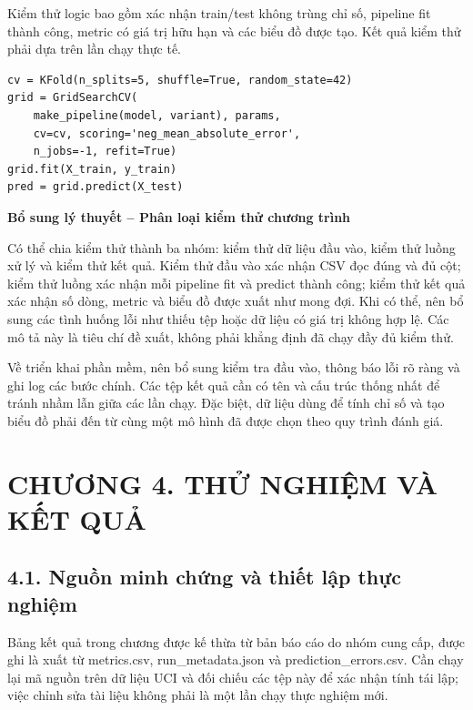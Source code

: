 \documentclass[12pt,a4paper,oneside]{article}
\begin{document}
Kiểm thử logic bao gồm xác nhận train/test không trùng chỉ số, pipeline
fit thành công, metric có giá trị hữu hạn và các biểu đồ được tạo. Kết
quả kiểm thử phải dựa trên lần chạy thực tế.

\begin{verbatim}
cv = KFold(n_splits=5, shuffle=True, random_state=42)
grid = GridSearchCV(
    make_pipeline(model, variant), params,
    cv=cv, scoring='neg_mean_absolute_error',
    n_jobs=-1, refit=True)
grid.fit(X_train, y_train)
pred = grid.predict(X_test)
\end{verbatim}


\par\noindent\textbf{Bổ sung lý thuyết -- Phân loại kiểm thử chương trình}\par
Có thể chia kiểm thử thành ba nhóm: kiểm thử dữ liệu đầu vào, kiểm thử luồng xử lý và kiểm thử kết quả. Kiểm thử đầu vào xác nhận CSV đọc đúng và đủ cột; kiểm thử luồng xác nhận mỗi pipeline fit và predict thành công; kiểm thử kết quả xác nhận số dòng, metric và biểu đồ được xuất như mong đợi. Khi có thể, nên bổ sung các tình huống lỗi như thiếu tệp hoặc dữ liệu có giá trị không hợp lệ. Các mô tả này là tiêu chí đề xuất, không phải khẳng định đã chạy đầy đủ kiểm thử.\par

Về triển khai phần mềm, nên bổ sung kiểm tra đầu vào, thông báo lỗi rõ ràng và ghi log các bước chính. Các tệp kết quả cần có tên và cấu trúc thống nhất để tránh nhầm lẫn giữa các lần chạy. Đặc biệt, dữ liệu dùng để tính chỉ số và tạo biểu đồ phải đến từ cùng một mô hình đã được chọn theo quy trình đánh giá.\par

\clearpage
\section*{CHƯƠNG 4. THỬ NGHIỆM VÀ KẾT QUẢ}

\subsection*{4.1. Nguồn minh chứng và thiết lập thực nghiệm}

Bảng kết quả trong chương được kế thừa từ bản báo cáo do nhóm cung cấp,
được ghi là xuất từ metrics.csv, run\_metadata.json và
prediction\_errors.csv. Cần chạy lại mã nguồn trên dữ liệu UCI và đối
chiếu các tệp này để xác nhận tính tái lập; việc chỉnh sửa tài liệu
không phải là một lần chạy thực nghiệm mới.
\end{document}
